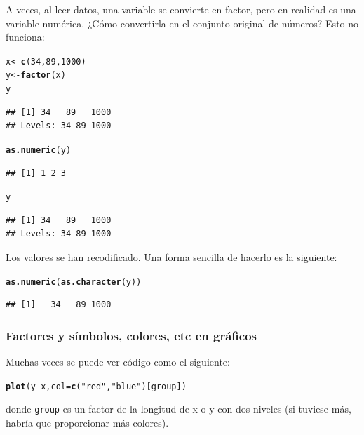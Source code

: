 \documentclass{config/apuntes}\usepackage[]{graphicx}\usepackage[]{xcolor}
\makeatletter
\newcommand{\hlnum}[1]{\textcolor[rgb]{0.686,0.059,0.569}{#1}}%
\newcommand{\hlsng}[1]{\textcolor[rgb]{0.192,0.494,0.8}{#1}}%
\newcommand{\hlopt}[1]{\textcolor[rgb]{0,0,0}{#1}}%
\newcommand{\hldef}[1]{\textcolor[rgb]{0.345,0.345,0.345}{#1}}%
\newcommand{\hlkwb}[1]{\textcolor[rgb]{0.69,0.353,0.396}{#1}}%
\newcommand{\hlkwc}[1]{\textcolor[rgb]{0.333,0.667,0.333}{#1}}%
\newcommand{\hlkwd}[1]{\textcolor[rgb]{0.737,0.353,0.396}{\textbf{#1}}}%
\newenvironment{kframe}{%
 \def\at@end@of@kframe{}%
 \ifinner\ifhmode%
  \def\at@end@of@kframe{\end{minipage}}%
  \begin{minipage}{\columnwidth}%
 \fi\fi%
 \def\FrameCommand##1{\hskip\@totalleftmargin \hskip-\fboxsep
 \colorbox{shadecolor}{##1}\hskip-\fboxsep
     \hskip-\linewidth \hskip-\@totalleftmargin \hskip\columnwidth}%
 \MakeFramed {\advance\hsize-\width
   \@totalleftmargin\z@ \linewidth\hsize
   \@setminipage}}%
 {\par\unskip\endMakeFramed%
 \at@end@of@kframe}
\newenvironment{knitrout}{}{} %
\newcommand{\code}[1]{\texttt{#1}}
\makeatother
\begin{document}
A veces, al leer datos, una variable se convierte en factor, pero en realidad es una variable numérica. ¿Cómo convertirla en el conjunto original de números? Esto no funciona:
\begin{knitrout}
\color{fgcolor}\begin{kframe}
\begin{alltt}
\hldef{x} \hlkwb{<-} \hlkwd{c}\hldef{(}\hlnum{34}\hldef{,} \hlnum{89}\hldef{,} \hlnum{1000}\hldef{)}
\hldef{y} \hlkwb{<-} \hlkwd{factor}\hldef{(x)}
\hldef{y}
\end{alltt}
\begin{verbatim}
## [1] 34   89   1000
## Levels: 34 89 1000
\end{verbatim}
\begin{alltt}
\hlkwd{as.numeric}\hldef{(y)}
\end{alltt}
\begin{verbatim}
## [1] 1 2 3
\end{verbatim}
\begin{alltt}
\hldef{y}
\end{alltt}
\begin{verbatim}
## [1] 34   89   1000
## Levels: 34 89 1000
\end{verbatim}
\end{kframe}
\end{knitrout}
Los valores se han recodificado. Una forma sencilla de hacerlo es la siguiente:
\begin{knitrout}
\color{fgcolor}\begin{kframe}
\begin{alltt}
\hlkwd{as.numeric}\hldef{(}\hlkwd{as.character}\hldef{(y))}
\end{alltt}
\begin{verbatim}
## [1]   34   89 1000
\end{verbatim}
\end{kframe}
\end{knitrout}

\subsubsection{Factores y símbolos, colores, etc en gráficos}
Muchas veces se puede ver código como el siguiente:
\begin{knitrout}
\color{fgcolor}\begin{kframe}
\begin{alltt}
\hlkwd{plot}\hldef{(y} \hlopt{~} \hldef{x,} \hlkwc{col} \hldef{=} \hlkwd{c}\hldef{(}\hlsng{"red"}\hldef{,} \hlsng{"blue"}\hldef{)[group])}
\end{alltt}
\end{kframe}
\end{knitrout}
donde \code{group} es un factor de la longitud de x o y con dos niveles (si tuviese más, habría que proporcionar más colores). 
\end{document}
